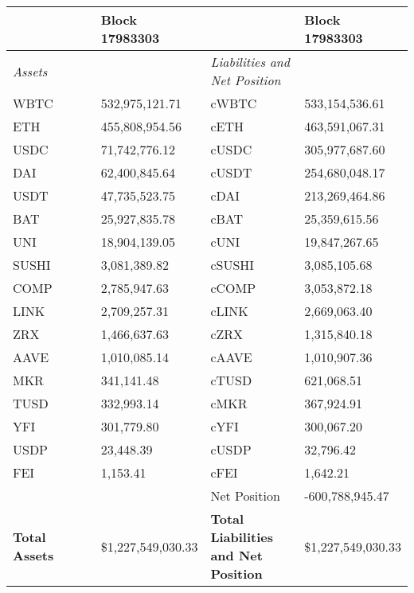 
\begin{longtable}{@{}p{0.25\linewidth}p{0.25\linewidth}p{0.25\linewidth}p{0.25\linewidth}@{}}

\toprule


& Block 17983303 & & Block 17983303 \\

\midrule
\textit{Assets} & & \textit{Liabilities and Net Position} \\
WBTC & 532,975,121.71 & cWBTC & 533,154,536.61 \\
ETH & 455,808,954.56 & cETH & 463,591,067.31 \\
USDC & 71,742,776.12 & cUSDC & 305,977,687.60 \\
DAI & 62,400,845.64 & cUSDT & 254,680,048.17 \\
USDT & 47,735,523.75 & cDAI & 213,269,464.86 \\
BAT & 25,927,835.78 & cBAT & 25,359,615.56 \\
UNI & 18,904,139.05 & cUNI & 19,847,267.65 \\
SUSHI & 3,081,389.82 & cSUSHI & 3,085,105.68 \\
COMP & 2,785,947.63 & cCOMP & 3,053,872.18 \\
LINK & 2,709,257.31 & cLINK & 2,669,063.40 \\
ZRX & 1,466,637.63 & cZRX & 1,315,840.18 \\
AAVE & 1,010,085.14 & cAAVE & 1,010,907.36 \\
MKR & 341,141.48 & cTUSD & 621,068.51 \\
TUSD & 332,993.14 & cMKR & 367,924.91 \\
YFI & 301,779.80 & cYFI & 300,067.20 \\
USDP & 23,448.39 & cUSDP & 32,796.42 \\
FEI & 1,153.41 & cFEI & 1,642.21 \\
 &  & Net Position & -600,788,945.47 \\

\midrule

\textbf{Total Assets} & \$1,227,549,030.33 & \textbf{Total Liabilities and Net Position} & \$1,227,549,030.33 \\

\bottomrule

\end{longtable}
